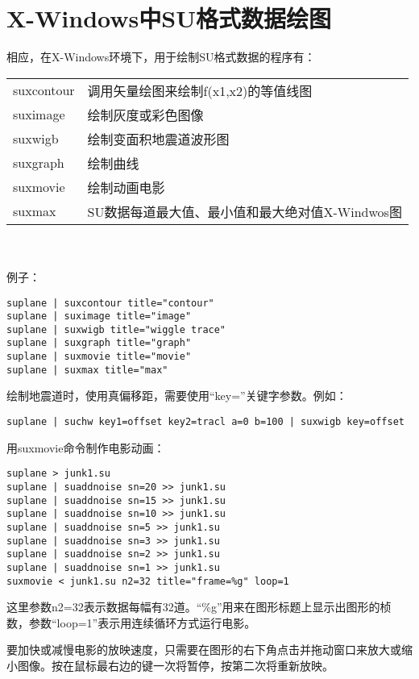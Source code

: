 \section{X-Windows中SU格式数据绘图}
相应，在X-Windows环境下，用于绘制SU格式数据的程序有：\\
\begin{tabular}{ll}
	\toprule
	suxcontour & 调用矢量绘图来绘制f(x1,x2)的等值线图\\
	suximage & 绘制灰度或彩色图像\\
	suxwigb & 绘制变面积地震道波形图\\
	suxgraph & 绘制曲线\\
	suxmovie & 绘制动画电影\\
	suxmax & SU数据每道最大值、最小值和最大绝对值X-Windwos图\\
	\bottomrule
\end{tabular}\\\\
例子：
\begin{lstlisting}
suplane | suxcontour title="contour" 
suplane | suximage title="image" 
suplane | suxwigb title="wiggle trace" 
suplane | suxgraph title="graph" 
suplane | suxmovie title="movie" 
suplane | suxmax title="max" 
\end{lstlisting}
绘制地震道时，使用真偏移距，需要使用“key=”关键字参数。例如：
\begin{lstlisting}
suplane | suchw key1=offset key2=tracl a=0 b=100 | suxwigb key=offset
\end{lstlisting}
用suxmovie命令制作电影动画：
\begin{lstlisting}
suplane > junk1.su
suplane | suaddnoise sn=20 >> junk1.su
suplane | suaddnoise sn=15 >> junk1.su
suplane | suaddnoise sn=10 >> junk1.su
suplane | suaddnoise sn=5 >> junk1.su
suplane | suaddnoise sn=3 >> junk1.su
suplane | suaddnoise sn=2 >> junk1.su
suplane | suaddnoise sn=1 >> junk1.su
suxmovie < junk1.su n2=32 title="frame=%g" loop=1 
\end{lstlisting}
这里参数n2=32表示数据每幅有32道。“\%g”用来在图形标题上显示出图形的桢数，参数“loop=1”表示用连续循环方式运行电影。\par
要加快或减慢电影的放映速度，只需要在图形的右下角点击并拖动窗口来放大或缩小图像。按在鼠标最右边的键一次将暂停，按第二次将重新放映。

